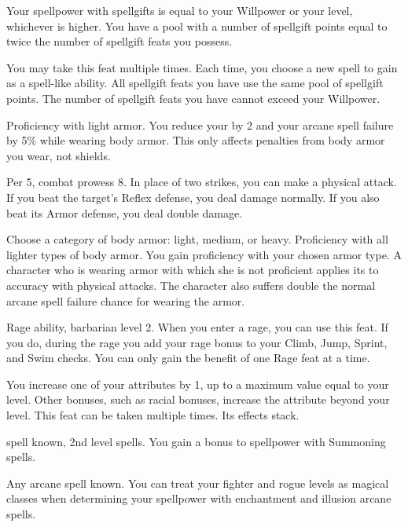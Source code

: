 Your spellpower with spellgifts is equal to your Willpower or your level, whichever is higher.
You have a pool with a number of spellgift points equal to twice the number of spellgift feats you possess.

You may take this feat multiple times.
Each time, you choose a new spell to gain as a spell-like ability.
All spellgift feats you have use the same pool of spellgift points.
The number of spellgift feats you have cannot exceed your Willpower.

\featpre Proficiency with light armor.
\featben You reduce your  by 2 and your arcane spell failure by 5\% while wearing body armor.
This only affects penalties from body armor you wear, not shields.

\featpres Per 5, combat prowess 8.
\featben In place of two strikes, you can make a physical attack.
If you beat the target's Reflex defense, you deal damage normally.
If you also beat its Armor defense, you deal double damage.

Choose a category of body armor: light, medium, or heavy.
\featpre Proficiency with all lighter types of body armor.
\featben You gain proficiency with your chosen armor type.
A character who is wearing armor with which she is not proficient applies its  to accuracy with physical attacks.
The character also suffers double the normal arcane spell failure chance for wearing the armor.

\featpres Rage ability, barbarian level 2.
\featben When you enter a rage, you can use this feat. If you do, during the rage you add your rage bonus to your Climb, Jump, Sprint, and Swim checks.
 You can only gain the benefit of one Rage feat at a time.

\featben You increase one of your attributes by 1, up to a maximum value equal to your level.
Other bonuses, such as racial bonuses, increase the attribute beyond your level.
 This feat can be taken multiple times. Its effects stack.

\featpres {} spell known, 2nd level spells.
\featben You gain a  bonus to spellpower with Summoning spells.

\featpre Any arcane spell known.
\featben You can treat your fighter and rogue levels as magical classes when determining your spellpower with enchantment and illusion arcane spells.

